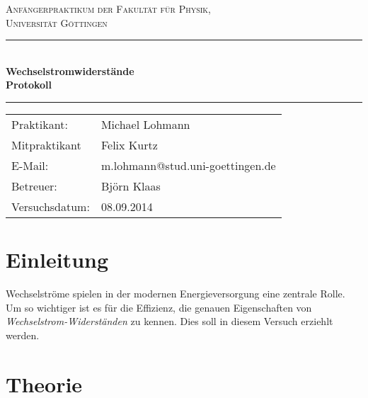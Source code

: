 \documentclass[12pt,a4paper,titlepage,headinclude,bibtotoc]{scrartcl}
\begin{document}
\begin{titlepage}
\centering
\textsc{\Large Anfängerpraktikum der Fakultät für
  Physik,\\[1.5ex] Universität Göttingen}

\vspace*{4.2cm}

\rule{\textwidth}{1pt}\\[0.5cm]
{\huge \bfseries
  Wechselstromwiderstände\\[1.5ex]
  Protokoll}\\[0.5cm]
\rule{\textwidth}{1pt}

\vspace*{2.5cm}

\begin{Large}
\begin{tabular}{ll}
Praktikant: &  Michael Lohmann\\
 Mitpraktikant &  Felix Kurtz\\
 E-Mail: & m.lohmann@stud.uni-goettingen.de\\
 Betreuer: & Björn Klaas\\
 Versuchsdatum: & 08.09.2014\\
\end{tabular}
\end{Large}

\vspace*{0.8cm}

\begin{Large}
\end{Large}

\end{titlepage}

\tableofcontents

\newpage

\section{Einleitung}
\label{sec:einleitung}
Wechselströme spielen in der modernen Energieversorgung eine zentrale Rolle.
Um so wichtiger ist es für die Effizienz, die genauen Eigenschaften von \emph{Wechselstrom-Widerständen} zu kennen.
Dies soll in diesem Versuch erziehlt werden.\cite{LP14}
\section{Theorie}
\label{sec:theorie}
                                                                                                                                                                      
\end{document}
